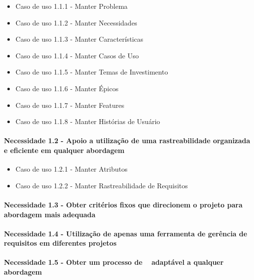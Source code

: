 	\begin{itemize}

	\item Caso de uso 1.1.1 - Manter Problema
	\item Caso de uso 1.1.2 - Manter Necessidades
	\item Caso de uso 1.1.3 - Manter Características
	\item Caso de uso 1.1.4 - Manter Casos de Uso
	\item Caso de uso 1.1.5 - Manter Temas de Investimento
	\item Caso de uso 1.1.6 - Manter Épicos
	\item Caso de uso 1.1.7 - Manter Features
	\item Caso de uso 1.1.8 - Manter Histórias de Usuário

	\end{itemize}

\paragraph{Necessidade 1.2 - Apoio a utilização de uma rastreabilidade organizada e eficiente em qualquer abordagem\\}

	\begin{itemize}
	\item Caso de uso 1.2.1 - Manter Atributos
	\item Caso de uso 1.2.2 - Manter Rastreabilidade de Requisitos
	\end{itemize}

\paragraph{Necessidade 1.3 - Obter critérios fixos que direcionem o projeto para abordagem mais adequada\\}

\paragraph{Necessidade 1.4 - Utilização de apenas uma ferramenta de gerência de requisitos em diferentes projetos\\}

\paragraph{Necessidade 1.5 - Obter um processo de \er~ adaptável a qualquer abordagem\\}

